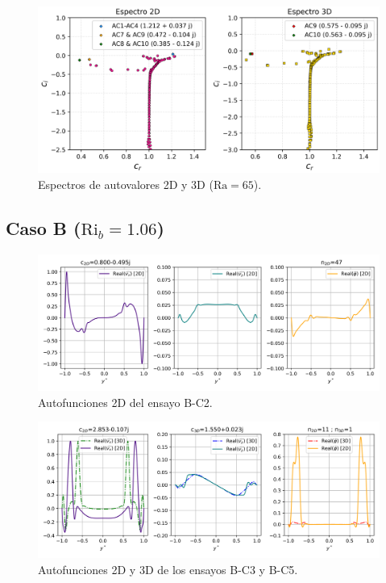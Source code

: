 \begin{figure}[H]
  \centering
    \includegraphics[width=\textwidth]{figures/apendices/transicion/Re5000-Pr071-Ri1Em6_eigenvals.png}
  \caption{Espectros de autovalores 2D y 3D ($\text{Ra}=65$).}
  \label{fig:spectra-Re5000-Pr0071}
\end{figure}

\newpage

\subsection*{Caso B ($\text{Ri}_b=1\text{.}06$)}


\begin{figure}[H]
  \centering
    \includegraphics[width=\textwidth]{figures/apendices/transicion/Re5000-Ri1Em4-Pr071_eigenfun_BC2.png}
  \caption{Autofunciones 2D del ensayo B-C2.}
  \label{fig:eigenfuns1-Re5000-Pr071}
\end{figure}

\begin{figure}[H]
  \centering    
    \includegraphics[width=\textwidth]{figures/apendices/transicion/Re5000-Ri1Em4-Pr071_eigenfun_BC3_BC5.png}
  \caption{Autofunciones 2D y 3D de los ensayos B-C3 y B-C5.}
  \label{fig:eigenfuns2-Re5000-Pr071}
\end{figure}

